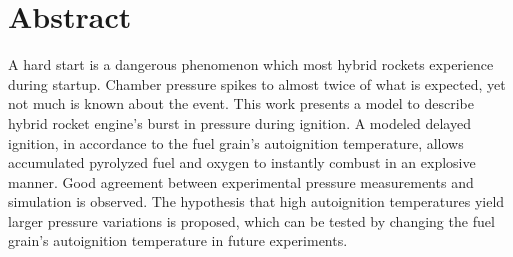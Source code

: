 \vspace{6cm}
\chapter*{Abstract}

A hard start is a dangerous phenomenon which most hybrid rockets experience during startup. Chamber pressure spikes to almost twice of what is expected, yet not much is known about the event. 
This work presents a model to describe hybrid rocket engine's burst in pressure during ignition. A modeled delayed ignition, in accordance to the fuel grain's autoignition temperature, allows accumulated pyrolyzed fuel and oxygen to instantly combust in an explosive manner. Good agreement between experimental pressure measurements and simulation is observed. The hypothesis that high autoignition temperatures yield larger pressure variations is proposed, which can be tested by changing the fuel grain's autoignition temperature in future experiments.

